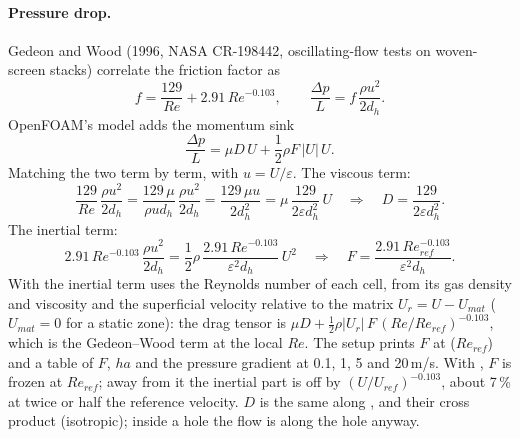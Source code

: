\paragraph{Pressure drop.}
Gedeon and Wood (1996, NASA CR-198442, oscillating-flow tests on woven-screen stacks) correlate the friction factor as
\begin{equation}
f = \frac{129}{Re} + 2.91\, Re^{-0.103},
\qquad \frac{\Delta p}{L} = f\, \frac{\rho u^2}{2 d_h} .
\end{equation}
OpenFOAM's  model adds the momentum sink
\begin{equation}
\frac{\Delta p}{L} = \mu D\, U + \frac{1}{2}\rho F\, |U|\, U .
\end{equation}
Matching the two term by term, with $u = U/\varepsilon$. The viscous term:
\begin{equation}
\frac{129}{Re}\,\frac{\rho u^2}{2 d_h} = \frac{129\,\mu}{\rho u d_h}\,\frac{\rho u^2}{2 d_h} = \frac{129\,\mu u}{2 d_h^2} = \mu\, \frac{129}{2\varepsilon d_h^2}\, U
\quad\Rightarrow\quad D = \frac{129}{2\varepsilon d_h^2} .
\end{equation}
The inertial term:
\begin{equation}
2.91\,Re^{-0.103}\,\frac{\rho u^2}{2 d_h} = \frac{1}{2}\rho\, \frac{2.91\, Re^{-0.103}}{\varepsilon^2 d_h}\, U^2
\quad\Rightarrow\quad F = \frac{2.91\, Re_{ref}^{-0.103}}{\varepsilon^2 d_h} .
\end{equation}
With  the inertial term uses the Reynolds number of each cell, from its gas density and viscosity and the superficial velocity relative to the matrix $U_r = U - U_{mat}$ ($U_{mat} = 0$ for a static zone): the drag tensor is $\mu D + \frac{1}{2}\rho|U_r|\,F\,(Re/Re_{ref})^{-0.103}$, which is the Gedeon--Wood term at the local $Re$. The setup prints $F$ at  ($Re_{ref}$) and a table of $F$, $ha$ and the pressure gradient at 0.1, 1, 5 and 20\,m/s. With , $F$ is frozen at $Re_{ref}$; away from it the inertial part is off by $(U/U_{ref})^{-0.103}$, about 7\,\% at twice or half the reference velocity. $D$ is the same along ,  and their cross product (isotropic); inside a hole the flow is along the hole anyway.

